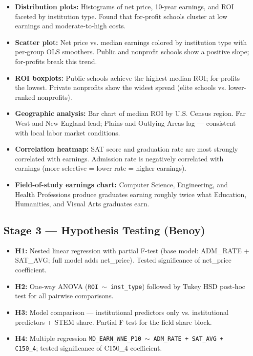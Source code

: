 \documentclass[12pt, letterpaper]{article}
\begin{document}
\begin{itemize}
  \item \textbf{Distribution plots:} Histograms of net price, 10-year earnings, and ROI faceted by institution type. Found that for-profit schools cluster at low earnings and moderate-to-high costs.
  \item \textbf{Scatter plot:} Net price vs. median earnings colored by institution type with per-group OLS smoothers. Public and nonprofit schools show a positive slope; for-profits break this trend.
  \item \textbf{ROI boxplots:} Public schools achieve the highest median ROI; for-profits the lowest. Private nonprofits show the widest spread (elite schools vs. lower-ranked nonprofits).
  \item \textbf{Geographic analysis:} Bar chart of median ROI by U.S. Census region. Far West and New England lead; Plains and Outlying Areas lag — consistent with local labor market conditions.
  \item \textbf{Correlation heatmap:} SAT score and graduation rate are most strongly correlated with earnings. Admission rate is negatively correlated with earnings (more selective = lower rate = higher earnings).
  \item \textbf{Field-of-study earnings chart:} Computer Science, Engineering, and Health Professions produce graduates earning roughly twice what Education, Humanities, and Visual Arts graduates earn.
\end{itemize}

\subsection{Stage 3 — Hypothesis Testing (Benoy)}

\begin{itemize}
  \item \textbf{H1:} Nested linear regression with partial F-test (base model: ADM\_RATE + SAT\_AVG; full model adds net\_price). Tested significance of net\_price coefficient.
  \item \textbf{H2:} One-way ANOVA (\texttt{ROI $\sim$ inst\_type}) followed by Tukey HSD post-hoc test for all pairwise comparisons.
  \item \textbf{H3:} Model comparison — institutional predictors only vs. institutional predictors + STEM share. Partial F-test for the field-share block.
  \item \textbf{H4:} Multiple regression \texttt{MD\_EARN\_WNE\_P10 $\sim$ ADM\_RATE + SAT\_AVG + C150\_4}; tested significance of C150\_4 coefficient.
\end{itemize}
\end{document}
